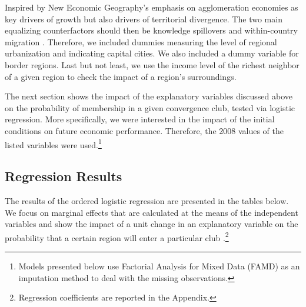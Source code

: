 \documentclass[11pt]{article}
\begin{document}
Inspired by New Economic Geography's emphasis on agglomeration economies as key drivers of growth but also drivers of territorial divergence. The two main equalizing 
counterfactors should then be knowledge spillovers and within-country migration  \citep{iammarino2017regional}. Therefore, we included dummies measuring the level of regional urbanization and indicating capital cities. We also included a dummy variable for border regions. %
Last but not least, we use the income level of the richest neighbor of a given region to check the impact of a region's surroundings.

The next section shows the impact of the explanatory variables discussed above on the probability of membership in a given convergence club, tested via logistic regression. More specifically, we were interested in the impact of the initial conditions on future economic performance. Therefore, the 2008 values of the listed variables were used.\footnote{Models presented below use Factorial Analysis for Mixed Data (FAMD) as an imputation method to deal with the missing observations.}

\subsection{Regression Results}

The results of the ordered logistic regression are presented in the tables below. We focus on marginal effects that are calculated at the means of the independent variables and show the impact of a unit change in an explanatory variable on the probability that a certain region will enter a particular club \citep{carrolloglmx}.\footnote{Regression coefficients are reported in the Appendix.}
\end{document}
